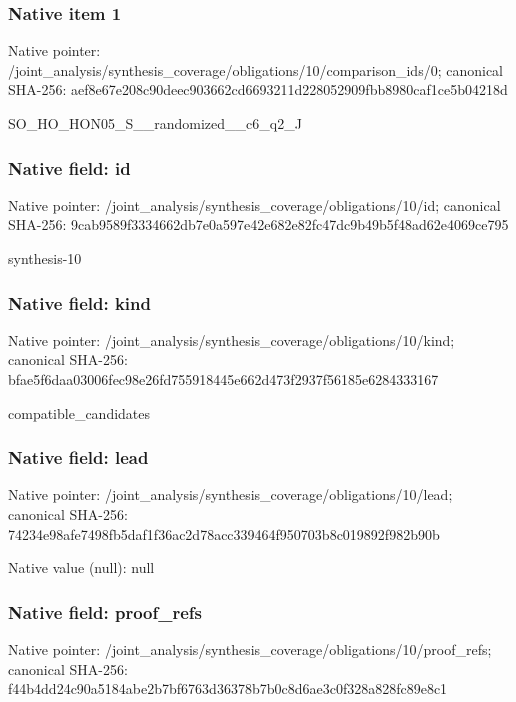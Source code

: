 \documentclass[10pt,a4paper]{article}
\begin{document}
\subsubsection{Native item 1}
Native pointer: /joint\_\allowbreak{}analysis/synthesis\_\allowbreak{}coverage/obligations/10/comparison\_\allowbreak{}ids/0; canonical SHA-256: aef8e67e208c90deec903662cd6693211d228052909fbb8980caf1ce5b04218d

\begingroup\raggedright\sloppy SO\_\allowbreak{}HO\_\allowbreak{}HON05\_\allowbreak{}S\_\allowbreak{}\_\allowbreak{}randomized\_\allowbreak{}\_\allowbreak{}c6\_\allowbreak{}q2\_\allowbreak{}J\par\endgroup

\subsubsection{Native field: id}
Native pointer: /joint\_\allowbreak{}analysis/synthesis\_\allowbreak{}coverage/obligations/10/id; canonical SHA-256: 9cab9589f3334662db7e0a597e42e682e82fc47dc9b49b5f48ad62e4069ce795

\begingroup\raggedright\sloppy synthesis-10\par\endgroup

\subsubsection{Native field: kind}
Native pointer: /joint\_\allowbreak{}analysis/synthesis\_\allowbreak{}coverage/obligations/10/kind; canonical SHA-256: bfae5f6daa03006fec98e26fd755918445e662d473f2937f56185e6284333167

\begingroup\raggedright\sloppy compatible\_\allowbreak{}candidates\par\endgroup

\subsubsection{Native field: lead}
Native pointer: /joint\_\allowbreak{}analysis/synthesis\_\allowbreak{}coverage/obligations/10/lead; canonical SHA-256: 74234e98afe7498fb5daf1f36ac2d78acc339464f950703b8c019892f982b90b

Native value (null): null

\subsubsection{Native field: proof\_\allowbreak{}refs}
Native pointer: /joint\_\allowbreak{}analysis/synthesis\_\allowbreak{}coverage/obligations/10/proof\_\allowbreak{}refs; canonical SHA-256: f44b4dd24c90a5184abe2b7bf6763d36378b7b0c8d6ae3c0f328a828fc89e8c1
\end{document}
